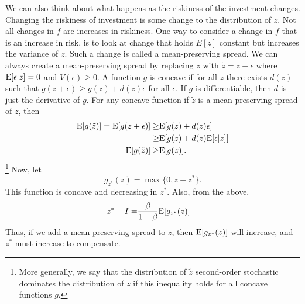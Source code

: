 \begin{example}
  We can also think about what happens as the riskiness of the
  investment changes. Changing the riskiness of investment is some
  change to the distribution of $z$.   
  Not all changes in $f$ are increases in riskiness. One way to
  consider a change in $f$ that is an increase in risk, is to look at
  change that holds $E[z]$ constant but increases the variance of
  $z$. Such a change is called a mean-preserving spread. We can always
  create a mean-preserving spread by replacing $z$ with $\tilde{z} = z
  + \epsilon$ where $\mathrm{E}[\epsilon|z] = 0$ and $V(\epsilon) \geq 0$. A
  function $g$ is concave if for all $z$ there exists $d(z)$ such that
  $g(z + \epsilon) \geq g(z) + d(z) \epsilon$ for all $\epsilon$. If
  $g$ is differentiable, then $d$ is just the derivative of $g$. For
  any concave function if $\tilde{z}$ is a mean preserving spread of
  $z$, then 
  \begin{align*}
    \mathrm{E}[g(\tilde{z})] = \mathrm{E}[g(z+\epsilon)] \geq & \mathrm{E}[g(z) + d(z) \epsilon] \\
    \geq & \mathrm{E}[g(z) + d(z) \mathrm{E}[\epsilon|z]] \\
    \mathrm{E}[g(\tilde{z})] \geq & \mathrm{E}[g(z)].
  \end{align*}\footnote{More generally, we say that the distribution
    of $\tilde{z}$ second-order stochastic dominates the distribution
    of $z$ if this inequality holds for all concave functions $g$.}
  Now, let 
  \[ g_{z^*}(z) = \max\{0, z - z^* \}. \] This function is concave and
  decreasing in $z^*$. Also, from the above,
  \begin{align*}
    z^* - I = & \frac{\beta}{1-\beta} \mathrm{E}[g_{z^*}(z)] 
  \end{align*}
  Thus, if we add a mean-preserving spread to $z$, then $\mathrm{E}[g_{z^*}(z)]$
  will increase, and $z^*$ must increase to compensate. 
\end{example}



\clearpage




